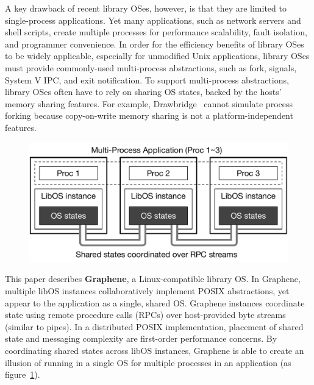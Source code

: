 A key drawback of recent library OSes, however,
is that they are limited to single-process applications.
Yet many applications, such as network servers and
shell scripts,
create multiple processes
for
performance scalability, fault isolation, and programmer convenience.
In order for the efficiency benefits of library OSes to be widely applicable,
especially for unmodified Unix applications,
library OSes must  provide commonly-used multi-process abstractions,
such as fork,  signals, System V IPC, and exit notification.
To support multi-process abstractions, library OSes often have to rely on sharing OS states,
backed by the hosts' memory sharing features.
For example, Drawbridge~\cite{porter11drawbridge} cannot simulate process forking because copy-on-write memory sharing is not a platform-independent features.


\begin{figure}[t!]
\centering
\includegraphics[width=0.75\linewidth]{graphene/figures/concept.pdf}
\caption{
\label{fig:concept}}
\end{figure}

This paper describes {\bf Graphene},  a Linux-compatible library OS.
In Graphene, multiple libOS instances collaboratively implement
POSIX abstractions,
yet appear to the application
as a single, shared OS.
Graphene instances coordinate state using remote procedure calls (RPCs) over
host-provided byte streams (similar to pipes).
In a distributed POSIX implementation, placement of shared state and messaging complexity
are first-order performance concerns.
By coordinating shared states across libOS instances,
Graphene is able to create an illusion 
of running in a single OS
for multiple processes in an application (as figure~\ref{fig:concept}).


